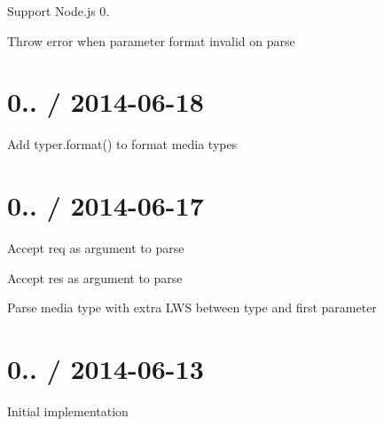 
\begin{DoxyItemize}
\item Support Node.\+js 0.
\item Throw error when parameter format invalid on parse
\end{DoxyItemize}

\section*{0.. / 2014-\/06-\/18 }


\begin{DoxyItemize}
\item Add {\ttfamily typer.\+format()} to format media types
\end{DoxyItemize}

\section*{0.. / 2014-\/06-\/17 }


\begin{DoxyItemize}
\item Accept {\ttfamily req} as argument to {\ttfamily parse}
\item Accept {\ttfamily res} as argument to {\ttfamily parse}
\item Parse media type with extra L\+WS between type and first parameter
\end{DoxyItemize}

\section*{0.. / 2014-\/06-\/13 }


\begin{DoxyItemize}
\item Initial implementation 
\end{DoxyItemize}
